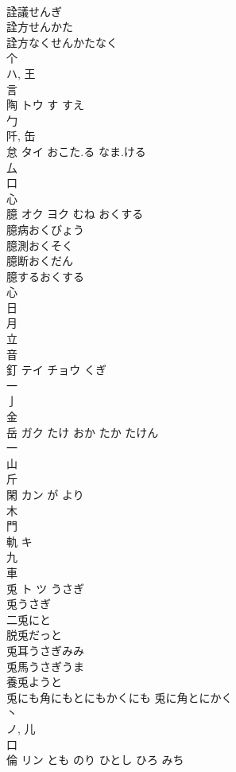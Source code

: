 \documentclass[8pt]{extreport}
\begin{document}
\begin{CJK}{UTF8}{min}
\\	詮議せんぎ
\\	詮方せんかた
\\	詮方なくせんかたなく
\\	个 
\\	ハ, 王 
\\	言 
\\	陶	トウ	す すえ	
\\	勹 
\\	阡, 缶 
\\	怠	タイ	おこた.る なま.ける	
\\	厶 
\\	口 
\\	心 
\\	臆	オク ヨク	むね おくする	
\\	臆病おくびょう 
\\	臆測おくそく 
\\	臆断おくだん 
\\	臆するおくする 
\\	心 
\\	日 
\\	月 
\\	立 
\\	音 
\\	釘	テイ チョウ	くぎ	
\\	一 
\\	亅 
\\	金 
\\	岳	ガク	たけ おか たか たけん	
\\	一 
\\	山 
\\	斤 
\\	閑	カン	が より	
\\	木 
\\	門 
\\	軌	キ		
\\	九 
\\	車 
\\	兎	ト ツ	うさぎ	
\\	兎うさぎ 
\\	二兎にと 
\\	脱兎だっと 
\\	兎耳うさぎみみ 
\\	兎馬うさぎうま 
\\	養兎ようと 
\\	兎にも角にもとにもかくにも 兎に角とにかく 
\\	丶 
\\	ノ, 儿 
\\	口 
\\	倫	リン	とも のり ひとし ひろ みち	

\end{CJK}
\end{document}
